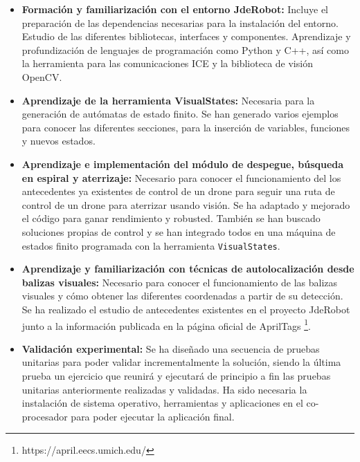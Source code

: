 \begin{itemize}
	
	\item \textbf{Formación y familiarización con el entorno JdeRobot:} Incluye el preparación de las dependencias necesarias para la instalación del entorno. Estudio de las diferentes bibliotecas, interfaces y componentes. Aprendizaje y profundización de lenguajes de programación como Python y C++, así como la herramienta para las comunicaciones ICE y la biblioteca de visión OpenCV.
	
	\item \textbf{Aprendizaje de la herramienta VisualStates:} Necesaria para la generación de autómatas de estado finito. Se han generado varios ejemplos para conocer las diferentes secciones, para la inserción de variables, funciones y nuevos estados.
	
	\item \textbf{Aprendizaje e implementación del módulo de despegue, búsqueda en espiral y aterrizaje:} Necesario para conocer el funcionamiento del los antecedentes ya existentes de control de un drone para seguir una ruta de control de un drone para aterrizar usando visión. Se ha adaptado y mejorado el código para ganar rendimiento y robusted. También se han buscado soluciones propias de control y se han integrado todos en una máquina de estados finito programada con la herramienta \texttt{VisualStates}.
	
	\item \textbf{Aprendizaje y familiarización con técnicas de autolocalización desde balizas visuales:} Necesario para conocer el funcionamiento de las balizas visuales y cómo obtener las diferentes coordenadas a partir de su detección. Se ha realizado el estudio de antecedentes existentes en el proyecto JdeRobot \cite{AlbertoLopez} \cite{ManuelZafra} junto a la información publicada en la página oficial de AprilTags \footnote{https://april.eecs.umich.edu/}. 
	
	\item \textbf{Validación experimental:} Se ha diseñado una secuencia de pruebas unitarias para poder validar incrementalmente la solución, siendo la última prueba un ejercicio que reunirá y ejecutará de principio a fin las pruebas unitarias anteriormente realizadas y validadas. Ha sido necesaria la instalación de sistema operativo, herramientas y aplicaciones en el co-procesador para poder ejecutar la aplicación final.
	
\end{itemize}
